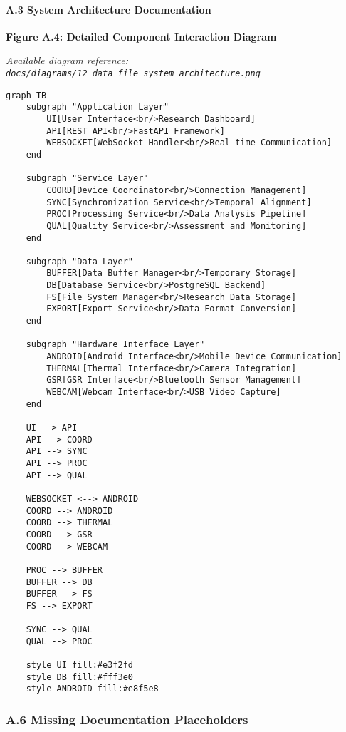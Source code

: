 \documentclass[12pt,a4paper]{article}
\begin{document}
\paragraph{A.3 System Architecture Documentation}

\textbf{Figure A.4: Detailed Component Interaction Diagram}

\textit{Available diagram reference: \texttt{docs/diagrams/12\_data\_file\_system\_architecture.png}}

\begin{verbatim}
graph TB
    subgraph "Application Layer"
        UI[User Interface<br/>Research Dashboard]
        API[REST API<br/>FastAPI Framework]
        WEBSOCKET[WebSocket Handler<br/>Real-time Communication]
    end
    
    subgraph "Service Layer"
        COORD[Device Coordinator<br/>Connection Management]
        SYNC[Synchronization Service<br/>Temporal Alignment]
        PROC[Processing Service<br/>Data Analysis Pipeline]
        QUAL[Quality Service<br/>Assessment and Monitoring]
    end
    
    subgraph "Data Layer"
        BUFFER[Data Buffer Manager<br/>Temporary Storage]
        DB[Database Service<br/>PostgreSQL Backend]
        FS[File System Manager<br/>Research Data Storage]
        EXPORT[Export Service<br/>Data Format Conversion]
    end
    
    subgraph "Hardware Interface Layer"
        ANDROID[Android Interface<br/>Mobile Device Communication]
        THERMAL[Thermal Interface<br/>Camera Integration]
        GSR[GSR Interface<br/>Bluetooth Sensor Management]
        WEBCAM[Webcam Interface<br/>USB Video Capture]
    end
    
    UI --> API
    API --> COORD
    API --> SYNC
    API --> PROC
    API --> QUAL
    
    WEBSOCKET <--> ANDROID
    COORD --> ANDROID
    COORD --> THERMAL
    COORD --> GSR
    COORD --> WEBCAM
    
    PROC --> BUFFER
    BUFFER --> DB
    BUFFER --> FS
    FS --> EXPORT
    
    SYNC --> QUAL
    QUAL --> PROC
    
    style UI fill:#e3f2fd
    style DB fill:#fff3e0
    style ANDROID fill:#e8f5e8
\end{verbatim}

\subsubsection{A.6 Missing Documentation Placeholders}
\end{document}
